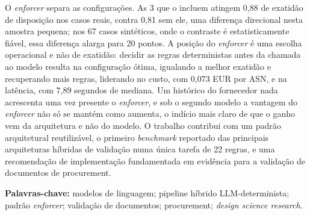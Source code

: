 O \emph{enforcer} separa as configurações. As 3 que o incluem atingem 0,88 de exatidão de disposição nos casos reais, contra 0,81 sem ele, uma diferença direcional nesta amostra pequena; nos 67 casos sintéticos, onde o contraste é estatisticamente fiável, essa diferença alarga para 20 pontos. A posição do \emph{enforcer} é uma escolha operacional e não de exatidão: decidir as regras deterministas antes da chamada ao modelo resulta na configuração ótima, igualando a melhor exatidão e recuperando mais regras, liderando no custo, com 0,073 EUR por ASN, e na latência, com 7,89 segundos de mediana. Um histórico do fornecedor nada acrescenta uma vez presente o \emph{enforcer}, e sob o segundo modelo a vantagem do \emph{enforcer} não só se mantém como aumenta, o indício mais claro de que o ganho vem da arquitetura e não do modelo. O trabalho contribui com um padrão arquitetural reutilizável, o primeiro \emph{benchmark} reportado das principais arquiteturas híbridas de validação numa única tarefa de 22 regras, e uma recomendação de implementação fundamentada em evidência para a validação de documentos de procurement.

\vspace{2em}
\noindent\textbf{Palavras-chave:} modelos de linguagem; pipeline híbrido LLM-determinista; padrão \emph{enforcer}; validação de documentos; procurement; \emph{design science research}.
